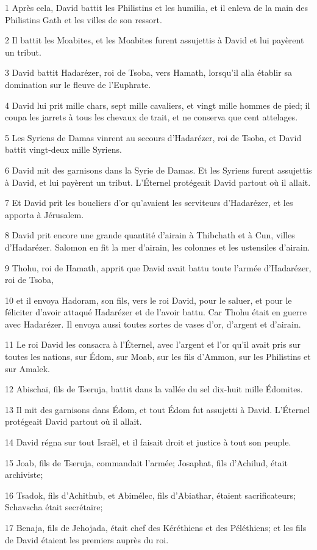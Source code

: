 \par 1 Après cela, David battit les Philistins et les humilia, et il enleva de la main des Philistins Gath et les villes de son ressort.
\par 2 Il battit les Moabites, et les Moabites furent assujettis à David et lui payèrent un tribut.
\par 3 David battit Hadarézer, roi de Tsoba, vers Hamath, lorsqu'il alla établir sa domination sur le fleuve de l'Euphrate.
\par 4 David lui prit mille chars, sept mille cavaliers, et vingt mille hommes de pied; il coupa les jarrets à tous les chevaux de trait, et ne conserva que cent attelages.
\par 5 Les Syriens de Damas vinrent au secours d'Hadarézer, roi de Tsoba, et David battit vingt-deux mille Syriens.
\par 6 David mit des garnisons dans la Syrie de Damas. Et les Syriens furent assujettis à David, et lui payèrent un tribut. L'Éternel protégeait David partout où il allait.
\par 7 Et David prit les boucliers d'or qu'avaient les serviteurs d'Hadarézer, et les apporta à Jérusalem.
\par 8 David prit encore une grande quantité d'airain à Thibchath et à Cun, villes d'Hadarézer. Salomon en fit la mer d'airain, les colonnes et les ustensiles d'airain.
\par 9 Thohu, roi de Hamath, apprit que David avait battu toute l'armée d'Hadarézer, roi de Tsoba,
\par 10 et il envoya Hadoram, son fils, vers le roi David, pour le saluer, et pour le féliciter d'avoir attaqué Hadarézer et de l'avoir battu. Car Thohu était en guerre avec Hadarézer. Il envoya aussi toutes sortes de vases d'or, d'argent et d'airain.
\par 11 Le roi David les consacra à l'Éternel, avec l'argent et l'or qu'il avait pris sur toutes les nations, sur Édom, sur Moab, sur les fils d'Ammon, sur les Philistins et sur Amalek.
\par 12 Abischaï, fils de Tseruja, battit dans la vallée du sel dix-huit mille Édomites.
\par 13 Il mit des garnisons dans Édom, et tout Édom fut assujetti à David. L'Éternel protégeait David partout où il allait.
\par 14 David régna sur tout Israël, et il faisait droit et justice à tout son peuple.
\par 15 Joab, fils de Tseruja, commandait l'armée; Josaphat, fils d'Achilud, était archiviste;
\par 16 Tsadok, fils d'Achithub, et Abimélec, fils d'Abiathar, étaient sacrificateurs; Schavscha était secrétaire;
\par 17 Benaja, fils de Jehojada, était chef des Kéréthiens et des Péléthiens; et les fils de David étaient les premiers auprès du roi.

